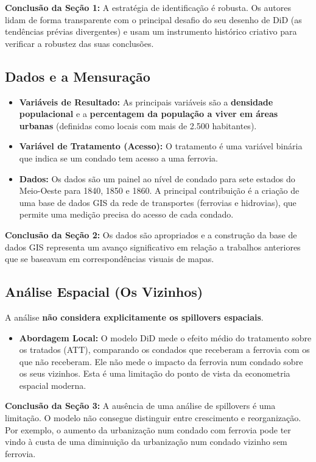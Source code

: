 \documentclass[12pt, a4paper]{article}
\begin{document}
\noindent\textbf{Conclusão da Seção 1:} A estratégia de identificação é robusta. Os autores lidam de forma transparente com o principal desafio do seu desenho de DiD (as tendências prévias divergentes) e usam um instrumento histórico criativo para verificar a robustez das suas conclusões.

\subsection{Dados e a Mensuração}

\begin{itemize}
    \item \textbf{Variáveis de Resultado:} As principais variáveis são a \textbf{densidade populacional} e a \textbf{percentagem da população a viver em áreas urbanas} (definidas como locais com mais de 2.500 habitantes).
    \item \textbf{Variável de Tratamento (Acesso):} O tratamento é uma variável binária que indica se um condado tem acesso a uma ferrovia.
    \item \textbf{Dados:} Os dados são um painel ao nível de condado para sete estados do Meio-Oeste para 1840, 1850 e 1860. A principal contribuição é a criação de uma base de dados GIS da rede de transportes (ferrovias e hidrovias), que permite uma medição precisa do acesso de cada condado.
\end{itemize}

\noindent\textbf{Conclusão da Seção 2:} Os dados são apropriados e a construção da base de dados GIS representa um avanço significativo em relação a trabalhos anteriores que se baseavam em correspondências visuais de mapas.

\subsection{Análise Espacial (Os Vizinhos)}
A análise \textbf{não considera explicitamente os spillovers espaciais}.
\begin{itemize}
    \item \textbf{Abordagem Local:} O modelo DiD mede o efeito médio do tratamento sobre os tratados (ATT), comparando os condados que receberam a ferrovia com os que não receberam. Ele não mede o impacto da ferrovia num condado sobre os seus vizinhos. Esta é uma limitação do ponto de vista da econometria espacial moderna.
\end{itemize}

\noindent\textbf{Conclusão da Seção 3:} A ausência de uma análise de spillovers é uma limitação. O modelo não consegue distinguir entre crescimento e reorganização. Por exemplo, o aumento da urbanização num condado com ferrovia pode ter vindo à custa de uma diminuição da urbanização num condado vizinho sem ferrovia.
\end{document}
